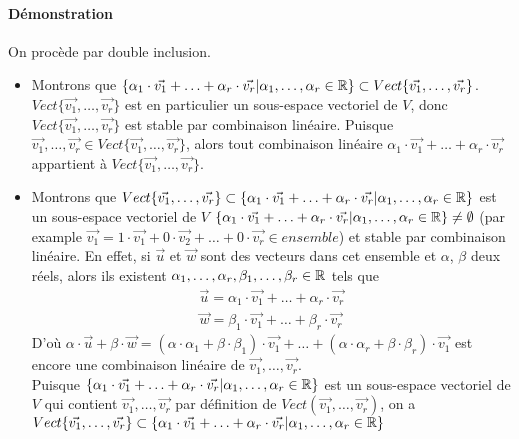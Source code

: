 \paragraph{Démonstration} On procède par double inclusion.
\begin{itemize}
  \item Montrons que $\{\alpha_1 \cdot \vec{v_1} + \ldots + \alpha_r \cdot \vec{v_r} | \alpha_1, \ldots, \alpha_r \in \mathbb{R} \} \subset Vect\{\vec{v_1}, \ldots, \vec{v_r}\}$. $Vect\{\vec{v_1}, \ldots, \vec{v_r}\}$ est en particulier un sous-espace vectoriel de $V$, donc $Vect\{\vec{v_1}, \ldots, \vec{v_r}\}$ est stable par combinaison linéaire. Puisque $\vec{v_1}, \ldots, \vec{v_r} \in Vect\{\vec{v_1}, \ldots, \vec{v_r}\}$, alors tout combinaison linéaire $\alpha_1 \cdot \vec{v_1} + \ldots + \alpha_r \cdot \vec{v_r}$ appartient à $Vect\{\vec{v_1}, \ldots, \vec{v_r}\}$.
  
  \item Montrons que $Vect\{\vec{v_1}, \ldots, \vec{v_r}\} \subset \{\alpha_1 \cdot \vec{v_1} + \ldots + \alpha_r \cdot \vec{v_r} | \alpha_1, \ldots, \alpha_r \in \mathbb{R} \}$ est un sous-espace vectoriel de $V$ $\{\alpha_1 \cdot \vec{v_1} + \ldots + \alpha_r \cdot \vec{v_r} | \alpha_1, \ldots, \alpha_r \in \mathbb{R} \} \neq \emptyset$ (par example $\vec{v_1} = 1 \cdot \vec{v_1} + 0 \cdot \vec{v_2} + \ldots + 0 \cdot \vec{v_r} \in ensemble$) et stable par combinaison linéaire. En effet, si $\vec{u}$ et $\vec{w}$ sont des vecteurs dans cet ensemble et $\alpha$, $\beta$ deux réels, alors ils existent $\alpha_1, \ldots, \alpha_r, \beta_1, \ldots, \beta_r \in \mathbb{R}$ tels que
    \begin{eqnarray*}
      \vec{u} = \alpha_1 \cdot \vec{v_1} + \ldots + \alpha_r \cdot \vec{v_r} \\
      \vec{w} = \beta_1 \cdot \vec{v_1} + \ldots + \beta_r \cdot \vec{v_r}
    \end{eqnarray*}
    D'où $\alpha \cdot \vec{u} + \beta \cdot \vec{w} = (\alpha \cdot \alpha_1 + \beta \cdot \beta_1)\cdot \vec{v_1} + \ldots + (\alpha \cdot \alpha_r + \beta \cdot \beta_r)\cdot \vec{v_1}$ est encore une combinaison linéaire de $\vec{v_1}, \ldots, \vec{v_r}$. \\
    Puisque $\{\alpha_1 \cdot \vec{v_1} + \ldots + \alpha_r \cdot \vec{v_r} | \alpha_1, \ldots, \alpha_r \in \mathbb{R} \}$ est un sous-espace vectoriel de $V$ qui contient $\vec{v_1}, \ldots, \vec{v_r}$ par définition de $Vect(\vec{v_1}, \ldots, \vec{v_r})$, on a $Vect\{\vec{v_1}, \ldots, \vec{v_r}\} \subset \{\alpha_1 \cdot \vec{v_1} + \ldots + \alpha_r \cdot \vec{v_r} | \alpha_1, \ldots, \alpha_r \in \mathbb{R} \}$
\end{itemize}

